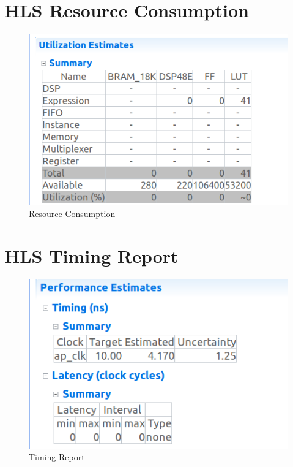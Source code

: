 \documentclass{article}
\begin{document}
\section{HLS Resource Consumption}
\vspace{3cm}
\begin{figure}[h]
    \centering
\includegraphics[width=\columnwidth]{figs/Resource_Consumption.png}
    \caption{Resource Consumption}
    \label{fig:my_label}
\end{figure}
\vspace{5cm}


\section{HLS Timing Report}
\vspace{1cm}
\begin{figure}[h]
    \centering
\includegraphics[width=\columnwidth]{figs/Timing_Report.png}
    \caption{Timing Report}
    \label{fig:my_label}
\end{figure}
\vspace{10cm}
\end{document}
